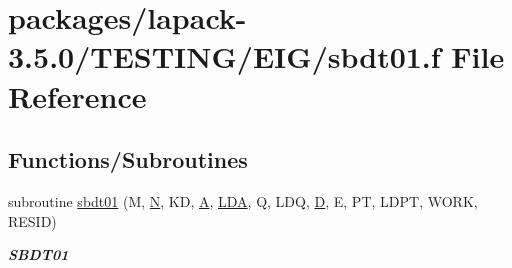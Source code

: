 \hypertarget{sbdt01_8f}{}\section{packages/lapack-\/3.5.0/\+T\+E\+S\+T\+I\+N\+G/\+E\+I\+G/sbdt01.f File Reference}
\label{sbdt01_8f}
\subsection*{Functions/\+Subroutines}
\begin{DoxyCompactItemize}
\item 
subroutine \hyperlink{group__single__eig_ga8ea54400bae844773a0e4cec9ab51ccd}{sbdt01} (M, \hyperlink{polmisc_8c_a0240ac851181b84ac374872dc5434ee4}{N}, K\+D, \hyperlink{classA}{A}, \hyperlink{example__user_8c_ae946da542ce0db94dced19b2ecefd1aa}{L\+D\+A}, Q, L\+D\+Q, \hyperlink{odrpack_8h_a7dae6ea403d00f3687f24a874e67d139}{D}, E, P\+T, L\+D\+P\+T, W\+O\+R\+K, R\+E\+S\+I\+D)
\begin{DoxyCompactList}\small\item\em {\bfseries S\+B\+D\+T01} \end{DoxyCompactList}\end{DoxyCompactItemize}
